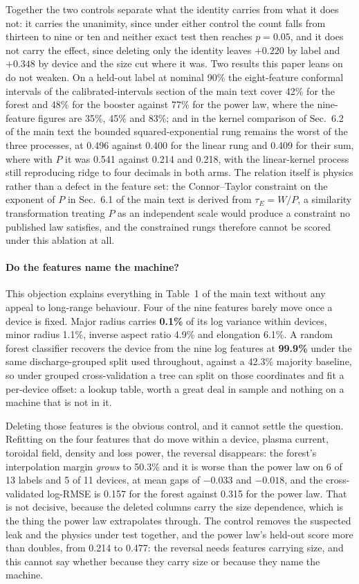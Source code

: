 \documentclass[12pt,letterpaper]{article}
\begin{document}
Together the two controls separate what the identity carries from what it does
not: it carries the unanimity, since under either control the count falls from
thirteen to nine or ten and neither exact test then reaches $p=0.05$, and it
does not carry the effect, since deleting only the identity leaves $+0.220$ by
label and $+0.348$ by device and the size cut where it was. Two results this
paper leans on do not weaken. On a held-out label at nominal 90\% the
eight-feature conformal intervals of the calibrated-intervals section of the main text cover 42\% for
the forest and 48\% for the booster against 77\% for the power law, where the
nine-feature figures are 35\%, 45\% and 83\%; and in the kernel comparison of
Sec.~6.2 of the main text the bounded squared-exponential rung remains the worst of the
three processes, at 0.496 against 0.400 for the linear rung and 0.409 for
their sum, where with $P$ it was 0.541 against 0.214 and 0.218, with the
linear-kernel process still reproducing ridge to four decimals in both arms.
The relation itself is physics rather than a defect in the feature set: the
Connor--Taylor constraint on the exponent of $P$ in Sec.~6.1 of the main text
is derived from $\tau_E = W/P$, a similarity transformation treating $P$ as an
independent scale would produce a constraint no published law satisfies, and
the constrained rungs therefore cannot be scored under this ablation at all.

\paragraph{Do the features name the machine?} This objection explains everything in
Table~1 of the main text without any appeal to long-range behaviour. Four of the
nine features barely move once a device is fixed. Major radius carries
\textbf{0.1\%} of its log variance within devices, minor radius 1.1\%, inverse
aspect ratio 4.9\% and elongation 6.1\%. A random forest classifier recovers the
device from the nine log features at \textbf{99.9\%} under the same
discharge-grouped split used throughout, against a 42.3\% majority baseline, so
under grouped cross-validation a tree can split on those coordinates and fit a
per-device offset: a lookup table, worth a great deal in sample and nothing on
a machine that is not in it.

Deleting those features is the obvious control, and it cannot settle the
question. Refitting on the four
features that do move within a device, plasma current, toroidal field, density
and loss power, the reversal disappears: the forest's interpolation margin
\emph{grows} to 50.3\% and it is worse than the power law on 6 of 13 labels and
5 of 11 devices, at mean gaps of $-0.033$ and $-0.018$, and the cross-validated log-RMSE is
0.157 for the forest against 0.315 for the power law. That is not decisive,
because the deleted columns carry the size dependence, which is the thing the
power law extrapolates through. The control removes the suspected leak and
the physics under test together, and the power law's held-out score more than
doubles, from 0.214 to 0.477: the reversal needs features carrying size, and
this cannot say whether because they carry size or because they name the
machine.
\end{document}
